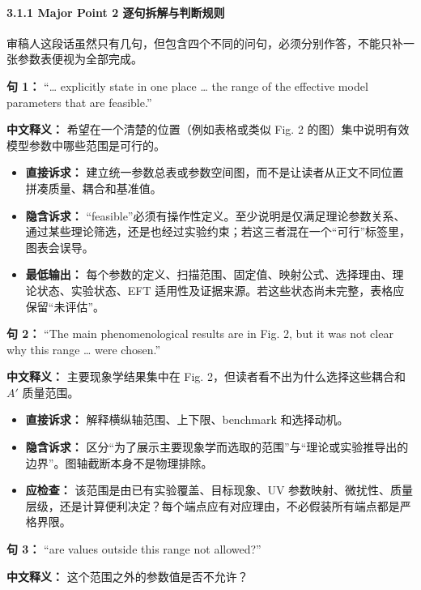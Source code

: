 \documentclass[
  chinese,
  UTF8]{ctexart}
\providecommand{\tightlist}{%
  \setlength{\itemsep}{0pt}\setlength{\parskip}{0pt}}
\begin{document}
\paragraph{3.1.1 Major Point 2
逐句拆解与判断规则}\label{major-point-2-ux9010ux53e5ux62c6ux89e3ux4e0eux5224ux65adux89c4ux5219}

审稿人这段话虽然只有几句，但包含四个不同的问句，必须分别作答，不能只补一张参数表便视为全部完成。

\textbf{句 1：} ``\ldots{} explicitly state in one place \ldots{} the
range of the effective model parameters that are feasible.''

\textbf{中文释义：} 希望在一个清楚的位置（例如表格或类似 Fig. 2
的图）集中说明有效模型参数中哪些范围是可行的。

\begin{itemize}
\tightlist
\item
  \textbf{直接诉求：}
  建立统一参数总表或参数空间图，而不是让读者从正文不同位置拼凑质量、耦合和基准值。
\item
  \textbf{隐含诉求：}
  ``feasible''必须有操作性定义。至少说明是仅满足理论参数关系、通过某些理论筛选，还是也经过实验约束；若这三者混在一个``可行''标签里，图表会误导。
\item
  \textbf{最低输出：}
  每个参数的定义、扫描范围、固定值、映射公式、选择理由、理论状态、实验状态、EFT
  适用性及证据来源。若这些状态尚未完整，表格应保留``未评估''。
\end{itemize}

\textbf{句 2：} ``The main phenomenological results are in Fig. 2, but
it was not clear why this range \ldots{} were chosen.''

\textbf{中文释义：} 主要现象学结果集中在 Fig.
2，但读者看不出为什么选择这些耦合和 \(A'\) 质量范围。

\begin{itemize}
\tightlist
\item
  \textbf{直接诉求：} 解释横纵轴范围、上下限、benchmark 和选择动机。
\item
  \textbf{隐含诉求：}
  区分``为了展示主要现象学而选取的范围''与``理论或实验推导出的边界''。图轴截断本身不是物理排除。
\item
  \textbf{应检查：} 该范围是由已有实验覆盖、目标现象、UV
  参数映射、微扰性、质量层级，还是计算便利决定？每个端点应有对应理由，不必假装所有端点都是严格界限。
\end{itemize}

\textbf{句 3：} ``are values outside this range not allowed?''

\textbf{中文释义：} 这个范围之外的参数值是否不允许？
\end{document}
